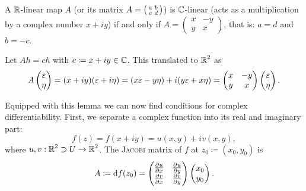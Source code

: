 \documentclass[a4paper,english]{article}
\begin{document}
\begin{lemma}
    A $\operatorname{\mathbb{R}}$-linear map $A$ (or its matrix $A = \begin{psmallmatrix} a & b \\ c & d \end{psmallmatrix}$) is $\operatorname{\mathbb{C}}$-linear (acts as a multiplication by a complex number $x + i y$) if and only if $A = \begin{pmatrix} x & - y \\ y & x \end{pmatrix}$, that is: $a = d$ and $b = -c$.
\end{lemma}

\begin{pr}
    Let $A h = c h$ with $c \coloneqq x + i y \in \operatorname{\mathbb{C}}$.
    This translated to $\operatorname{\mathbb{R}}^2$ as
    \begin{equation*}
        A \begin{pmatrix} \varepsilon \\ \eta \end{pmatrix}
        = (x + i y) (\varepsilon + i \eta)
        = (x \varepsilon - y \eta) + i (y \varepsilon + x \eta)
        = \begin{pmatrix}
            x & - y \\
            y & x
        \end{pmatrix}
        \begin{pmatrix} \varepsilon \\ \eta \end{pmatrix}.
    \end{equation*}
\end{pr}

Equipped with this lemma we can now find conditions for complex differentiability.
First, we separate a complex function into its real and imaginary part:
\begin{equation*}
    f(z)
    = f(x + i y)
    = u(x, y) + i v(x,y),
\end{equation*}
where $u,v: \operatorname{\mathbb{R}}^2 \supset U \to \operatorname{\mathbb{R}}^2$.
The \textsc{Jacobi} matrix of $f$ at $z_0 \coloneqq (x_0, y_0)$ is
\begin{equation*}
    A
    \coloneqq \mathop{}\!\mathrm{d} f(z_0)
    = \begin{pmatrix}
        \frac{\partial u}{\partial x} & \frac{\partial u}{\partial y} \\
        \frac{\partial v}{\partial x} & \frac{\partial v}{\partial y}
    \end{pmatrix}
    \begin{pmatrix} x_0 \\ y_0 \end{pmatrix}.
\end{equation*}
\end{document}
